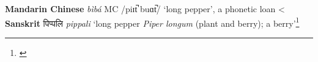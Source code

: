 \begin{etymology}\label{ety:biba}
\textbf{Mandarin Chinese}  \textit{bìbá} MC /piɪt̚  buɑt̚/ `long pepper', a phonetic loan
< \textbf{Sanskrit} {पिप्पलि } \textit{pippali} `long pepper \textit{Piper longum} (plant and berry); a berry'\footnote{\textcite[626]{monier-williams_sanskrit-english_1899}}
\end{etymology}
